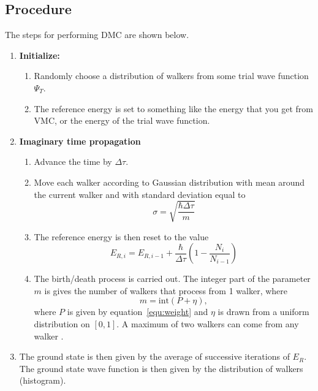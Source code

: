 \subsection*{Procedure}
The steps for performing DMC are shown below.
\begin{enumerate}
\item \textbf{Initialize:}
  \begin{enumerate}
  \item Randomly choose a distribution of walkers from some trial wave function $\Psi_T$.
  \item The reference energy is set to something like the energy that you get from VMC, or the energy of the trial wave function.
  \end{enumerate}

\item \textbf{Imaginary time propagation}
  \begin{enumerate}
  \item Advance the time by $\Delta \tau$.
  \item Move each walker according to Gaussian distribution with mean around the current walker and with standard deviation equal to
    \begin{equation}
      \sigma = \sqrt{\frac{\hbar \Delta \tau}{m}}
    \end{equation}
  \item The reference energy is then reset to the value
    \begin{equation}
      E_{R,i} = E_{R,i-1} + \frac{\hbar}{\Delta \tau} \left( 1-\frac{N_i}{N_{i-1}}\right)
    \end{equation}
  \item The birth/death process is carried out. The integer part of the parameter $m$ is gives the number of walkers that process from 1 walker, where
    \begin{equation}
      m = \mathrm{int} (P+\eta),
    \end{equation}
    where $P$ is given by equation~\ref{equ:weight} and $\eta$ is drawn from a uniform distribution on $[0,1]$. A maximum of two walkers can come from any walker \cite{kosztin1996}.
  \end{enumerate}

\item The ground state is then given by the average of successive iterations of $E_R$. The ground state wave function is then given by the distribution of walkers (histogram).
\end{enumerate}


